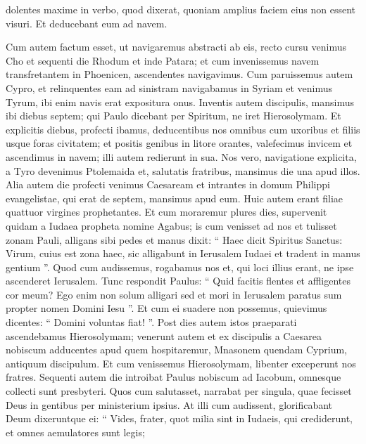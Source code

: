 \begin{biblechapter}
\begin{biblechapter}
\begin{biblechapter}
\begin{biblechapter}
\begin{biblechapter}
\begin{biblechapter}
\begin{biblechapter}
\begin{biblechapter}
\begin{biblechapter}
\begin{biblechapter}
\begin{biblechapter}
\begin{biblechapter}
\begin{biblechapter}
\begin{biblechapter}
\begin{biblechapter}
\begin{biblechapter}
\begin{biblechapter}
\begin{biblechapter}
\begin{biblechapter}
\begin{biblechapter}
\verse dolentes maxime in verbo, quod dixerat, quoniam amplius faciem eius non essent visuri. Et deducebant eum ad navem.
 
\begin{biblechapter}
\verse Cum autem factum esset, ut navigaremus abstracti ab eis, recto cursu venimus Cho et sequenti die Rhodum et inde Patara; 
\verse et cum invenissemus navem transfretantem in Phoenicen, ascendentes navigavimus. 
\verse Cum paruissemus autem Cypro, et relinquentes eam ad sinistram navigabamus in Syriam et venimus Tyrum, ibi enim navis erat expositura onus. 
\verse Inventis autem discipulis, mansimus ibi diebus septem; qui Paulo dicebant per Spiritum, ne iret Hierosolymam. 
\verse Et explicitis diebus, profecti ibamus, deducentibus nos omnibus cum uxoribus et filiis usque foras civitatem; et positis genibus in litore orantes, 
\verse valefecimus invicem et ascendimus in navem; illi autem redierunt in sua. 
\verse Nos vero, navigatione explicita, a Tyro devenimus Ptolemaida et, salutatis fratribus, mansimus die una apud illos.
 \verse Alia autem die profecti venimus Caesaream et intrantes in domum Philippi evangelistae, qui erat de septem, mansimus apud eum. 
\verse Huic autem erant filiae quattuor virgines prophetantes. 
\verse Et cum moraremur plures dies, supervenit quidam a Iudaea propheta nomine Agabus; 
\verse is cum venisset ad nos et tulisset zonam Pauli, alligans sibi pedes et manus dixit: “ Haec dicit Spiritus Sanctus: Virum, cuius est zona haec, sic alligabunt in Ierusalem Iudaei et tradent in manus gentium ”. 
\verse Quod cum audissemus, rogabamus nos et, qui loci illius erant, ne ipse ascenderet Ierusalem. 
\verse Tunc respondit Paulus: “ Quid facitis flentes et affligentes cor meum? Ego enim non solum alligari sed et mori in Ierusalem paratus sum propter nomen Domini Iesu ”. 
\verse Et cum ei suadere non possemus, quievimus dicentes: “ Domini voluntas fiat! ”.
 \verse Post dies autem istos praeparati ascendebamus Hierosolymam; 
\verse venerunt autem et ex discipulis a Caesarea nobiscum adducentes apud quem hospitaremur, Mnasonem quendam Cyprium, antiquum discipulum.
 \verse Et cum venissemus Hierosolymam, libenter exceperunt nos fratres. 
\verse Sequenti autem die introibat Paulus nobiscum ad Iacobum, omnesque collecti sunt presbyteri. 
\verse Quos cum salutasset, narrabat per singula, quae fecisset Deus in gentibus per ministerium ipsius. 
\verse At illi cum audissent, glorificabant Deum dixeruntque ei: “ Vides, frater, quot milia sint in Iudaeis, qui crediderunt, et omnes aemulatores sunt legis; 

\end{biblechapter}
\end{biblechapter}
\end{biblechapter}
\end{biblechapter}
\end{biblechapter}
\end{biblechapter}
\end{biblechapter}
\end{biblechapter}
\end{biblechapter}
\end{biblechapter}
\end{biblechapter}
\end{biblechapter}
\end{biblechapter}
\end{biblechapter}
\end{biblechapter}
\end{biblechapter}
\end{biblechapter}
\end{biblechapter}
\end{biblechapter}
\end{biblechapter}
\end{biblechapter}
